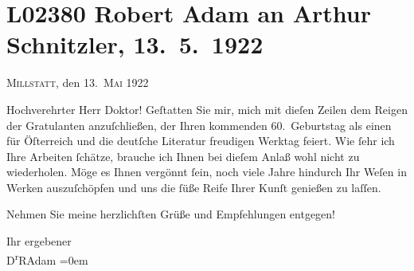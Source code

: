 

\section[Robert Adam an Arthur Schnitzler, 13. 5. 1922]{L02380 Robert Adam an Arthur Schnitzler, 13. 5. 1922}
\nopagebreak{}
\rehead{ }\normalsize\beginnumbering{}
\toendnotes[C]{\smallbreak\pagebreak[2]}
\pstart
           \raggedleft{}{\pb}\textsc{Millstatt}, den 13. \textsc{Mai} 1922\pend
           
\pstart\center{}Hochverehrter Herr Doktor!\pend\vspace{0.5em}
\pstart
           Geſtatten Sie mir, mich mit dieſen Zeilen dem Reigen der Gratulanten anzuſchließen,
               der Ihren kommenden 60. Geburtstag als einen für Öſterreich und die deutſche Literatur freudigen Werktag feiert. Wie ſehr ich
               Ihre Arbeiten ſchätze, brauche ich Ihnen bei dieſem Anlaß wohl nicht zu wiederholen.
               Möge es Ihnen vergönnt ſein, {\pb}noch viele Jahre
               hindurch Ihr Weſen in Werken auszuſchöpfen und uns die ſüße Reife Ihrer Kunſt
               genießen zu laſſen.\pend
           
\pstart
           Nehmen Sie meine herzlichſten Grüße und Empfehlungen entgegen!\pend
           
\pstart
           Ihr ergebener{\\[\baselineskip]}\spacefill\mbox{D\textsuperscript{r}RAdam}\pend
           \leftskip=0em{}\endnumbering{}  
      